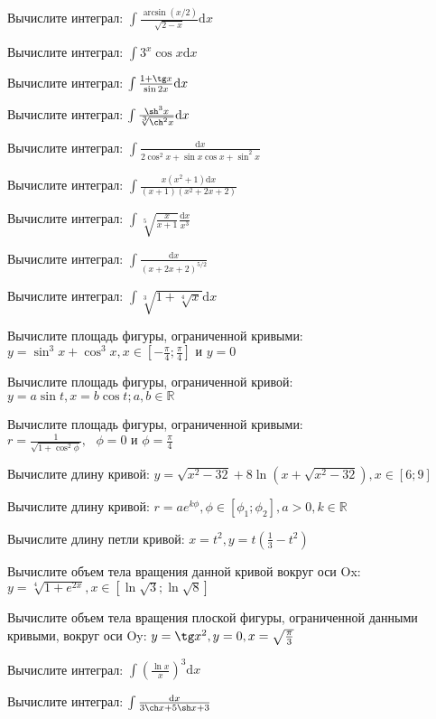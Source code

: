 \documentclass[russian]{article}
\newcommand{\dx}{\text{d}x}
\begin{document}

Вычислите интеграл:
$\int\frac{\arcsin(x/2)}{\sqrt{2 - x}} \dx$

Вычислите интеграл:
$\int 3^x \cos x \dx$

Вычислите интеграл:
$\int \frac{1 + \tg x}{\sin 2x} \dx$

Вычислите интеграл:
$\int \frac{\sh^3 x}{\sqrt[3]{\ch^2x}} \dx$

Вычислите интеграл:
$\int \frac{\dx}{2\cos^2 x+ \sin x \cos x + \sin^2 x}$



Вычислите интеграл:
$\int \frac{x(x^2 + 1) \dx}{(x + 1)(x^2 + 2x + 2)}$

Вычислите интеграл:
$\int \sqrt[5]{\frac{x}{x + 1}} \frac{\dx}{x^3}$

Вычислите интеграл:
$\int \frac{\dx}{(x + 2x + 2)^{5/2}}$

Вычислите интеграл:
$\int \sqrt[3]{1 + \sqrt[4]{x}} \dx$





Вычислите площадь фигуры, ограниченной кривыми:
$y = \sin^3 x + \cos^3 x, x \in [-\frac{\pi}{4}; \frac{\pi}{4}] \text{ и } y = 0$

Вычислите площадь фигуры, ограниченной кривой:
$y = a\sin t, x = b\cos t; a, b \in \mathbb{R}$

Вычислите площадь фигуры, ограниченной кривыми:
$r = \frac{1}{\sqrt{1 + \cos^2 \phi}}, \text{ } \phi = 0 \text{ и } \phi = \frac{\pi}{4}$






Вычислите длину кривой:
$y =\sqrt{x^2 -32} + 8 \ln(x + \sqrt{x^2 - 32}), x \in [6;9]$

Вычислите длину кривой:
$r = ae^{k\phi}, \phi \in [\phi_1;\phi_2], a > 0, k \in \mathbb{R}$

Вычислите длину петли кривой:
$x = t^2, y = t(\frac{1}{3} - t^2)$

Вычислите объем тела вращения данной кривой вокруг оси Ox:
$y = \sqrt[4]{1 + e^{2x}}, x \in [\ln \sqrt{3}; \ln \sqrt{8}]$

Вычислите объем тела вращения плоской фигуры, ограниченной данными кривыми, вокруг оси Oy:
$y = \tg x^2, y = 0, x = \sqrt{\frac{\pi}{3}}$ 



Вычислите интеграл:
$\int \left(\frac{\ln x}{x} \right)^3 \dx$

Вычислите интеграл:
$\int \frac{\dx}{3 \ch x + 5 \sh x + 3}$
\end{document}

